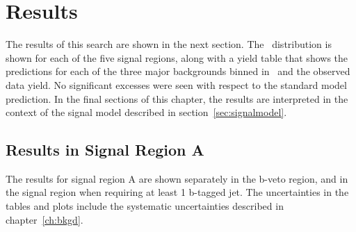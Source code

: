 \chapter{Results}
\label {ch:results}
The results of this search are shown in the next section.
The \MET\ distribution is shown for each of the five signal regions,
along with a yield table that shows the predictions for each of the three major backgrounds binned in \MET\ and the observed data yield.
No significant excesses were seen with respect to the standard model prediction.
In the final sections of this chapter,
the results are interpreted in the context of the signal model described in section~\ref{sec:signalmodel}.

\section{Results in Signal Region A}
The results for signal region A are shown separately in the b-veto region, and in the signal region when requiring at least 1 b-tagged jet.
The uncertainties in the tables and plots include the systematic uncertainties described in chapter~\ref{ch:bkgd}.

\begin{table}[htb]
  \scriptsize
  \begin{center}
    \caption{\label{tab:results_bveto_SRA} 
      Results are shown for signal region A when requiring a b-veto.
      Systematic uncertainties for each region are included in the total uncertainty. 
    }
  \end{center}
\end{table}


